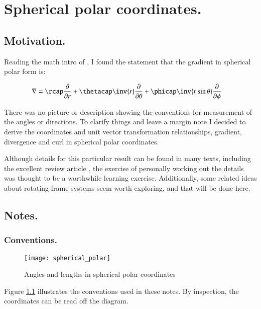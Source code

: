 \chapter{Spherical polar coordinates.}
\label{chap:sphericalPolar}
\date{ Nov 13, 2008.  $RCSfile: sphericalPolar.tex,v $ Last $Revision: 1.20 $ $Date: 2009/10/22 02:07:20 $ }

\section{Motivation. }

Reading the math intro of \cite{zeilik1998iaa}, I found the statement that the gradient in spherical polar form is:

\begin{align*}
\grad &= 
\rcap \PD{r}{}
+\thetacap \inv{r} \PD{\theta}{}
+\phicap \inv{r \sin\theta}\PD{\phi}{}
\end{align*}

There was no picture or description showing the conventions for measurement of the angles or directions.
To clarify things and leave a margin note I decided to derive the coordinates and unit vector transformation relationships,
gradient, divergence and curl in spherical polar coordinates.

Although details for this particular result can be found in many texts,
including the excellent review article \cite{fleischCoords}, the 
exercise of personally working out the details was thought to be
a worthwhile
learning exercise.  Additionally, some related ideas about rotating
frame systems seem worth exploring, and that will be done here.

\section{Notes. }
\subsection{Conventions. }

\begin{figure}[htp]
\centering
\texttt{[image: spherical\_polar]}
\caption{Angles and lengths in spherical polar coordinates}\label{fig:spherical_polar}
\end{figure}

Figure \ref{fig:spherical_polar} illustrates the conventions used in 
these notes.  By inspection, the coordinates can be read off the diagram.

